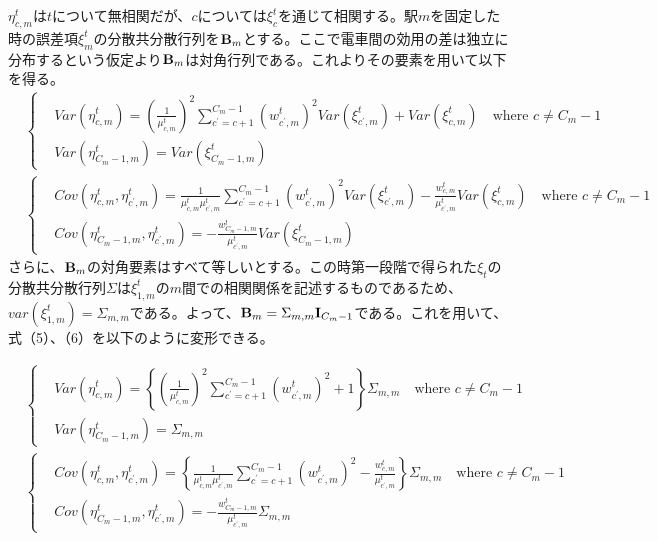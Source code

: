 \documentclass{jsarticle}
\begin{document}
$\eta_{c,m}^t$は$t$について無相関だが、$c$については$\xi_c^t$を通じて相関する。駅$m$を固定した時の誤差項$\xi_m^t$の分散共分散行列を${\bf B}_m$とする。ここで電車間の効用の差は独立に分布するという仮定より${\bf B}_m$は対角行列である。これよりその要素を用いて以下を得る。
\begin{align}
&\begin{cases}
	&Var(\eta_{c,m}^t) = \left( \frac{1}{\mu_{c,m}^t} \right)^2 \sum_{c^{'} = c+1}^{C_m-1} \left( w_{c^{'},m}^t \right)^2 Var(\xi_{c^{'},m}^t) + Var(\xi_{c,m}^t)\quad \text{where $c \neq C_m-1$}\\[8pt]
	&Var(\eta_{C_m-1,m}^t) = Var(\xi_{C_m-1,m}^t)
\end{cases}\\[8pt]
&\begin{cases}
	&Cov(\eta_{c,m}^t, \eta_{c^{'},m}^t) = \frac{1}{\mu_{c,m}^t \mu_{c^{'},m}^t} \sum_{c^{'} = c+1}^{C_m-1} \left( w_{c^{'},m}^t \right)^2 Var(\xi_{c^{'},m}^t) - \frac{w_{c,m}^t}{\mu_{c^{'},m}^t}Var(\xi_{c,m}^t)\quad \text{where $c \neq C_m-1$}\\[8pt]
	&Cov(\eta_{C_m-1,m}^t, \eta_{c^{'},m}^t) = -\frac{w_{C_m-1,m}^t}{\mu_{c^{'},m}^t} Var(\xi_{C_m-1,m}^t)
\end{cases}
\end{align}
さらに、${\bf B}_m$の対角要素はすべて等しいとする。この時第一段階で得られた$\xi_t$の分散共分散行列$\Sigma$は$\xi_{1,m}^t$の$m$間での相関関係を記述するものであるため、$var(\xi_{1,m}^t) = \Sigma_{m, m}$である。よって、${\bf B}_m = \Sigma_{m,m} {\bf I}_{C_m-1}$である。これを用いて、式（5）、（6）を以下のように変形できる。

\begin{align*}
&\begin{cases}
	&Var(\eta_{c,m}^t) = \left\{ \left( \frac{1}{\mu_{c,m}^t} \right)^2 \sum_{c^{'} = c+1}^{C_m-1} \left( w_{c^{'},m}^t \right)^2  + 1\right\} \Sigma_{m, m} \quad \text{where $c \neq C_m-1$}\\[8pt]
	&Var(\eta_{C_m-1,m}^t) = \Sigma_{m,m}
\end{cases}\\[8pt]
&\begin{cases}
	&Cov(\eta_{c,m}^t, \eta_{c^{'},m}^t) = \left\{\frac{1}{\mu_{c,m}^t \mu_{c^{'},m}^t} \sum_{c^{'} = c+1}^{C_m-1} \left( w_{c^{'},m}^t \right)^2  - \frac{w_{c,m}^t}{\mu_{c^{'},m}^t} \right\} \Sigma_{m,m}\quad \text{where $c \neq C_m-1$}\\[8pt]
	&Cov(\eta_{C_m-1,m}^t, \eta_{c^{'},m}^t) = -\frac{w_{C_m-1,m}^t}{\mu_{c^{'},m}^t} \Sigma_{m,m}
\end{cases}
\end{align*}
\end{document}
